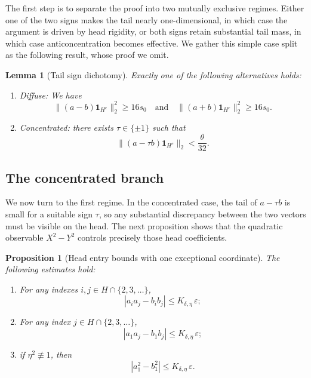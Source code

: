 \documentclass[11pt]{amsart}
\numberwithin{equation}{section}
\newtheorem{proposition}[theorem]{Proposition}
\newtheorem{lemma}[theorem]{Lemma}
\theoremstyle{definition}
\theoremstyle{remark}
\newcommand{\eps}{\varepsilon}
\newcommand{\norm}[1]{\lVert #1 \rVert}
\begin{document}
The first step is to separate the proof into two mutually exclusive regimes.
Either one of the two signs makes the tail nearly one-dimensional, in which
case the argument is driven by head rigidity, or both signs retain substantial
tail mass, in which case anticoncentration becomes effective. We gather this simple case split as the following result, whose proof we omit. 

\begin{lemma}[Tail sign dichotomy]\label{lem:dichotomy}
Exactly one of the following alternatives holds:
\begin{enumerate}[label=\rm(\roman*)]
\item \textit{Diffuse:} We have
\[
\norm{(a-b)\mathbf 1_{H^c}}_2^2\ge16s_0
\quad\text{and}\quad
\norm{(a+b)\mathbf 1_{H^c}}_2^2\ge16s_0.
\]
\item \textit{Concentrated:} there exists $\tau\in\{\pm1\}$ such that
\[
\norm{(a-\tau b)\mathbf 1_{H^c}}_2<\frac{\theta}{32}.
\]
\end{enumerate}
\end{lemma}



\subsection{The concentrated branch}

We now turn to the first regime.  In the concentrated case, the tail of
$a-\tau b$ is small for a suitable sign $\tau$, so any substantial discrepancy
between the two vectors must be visible on the head.  The next proposition
shows that the quadratic observable $X^2-Y^2$ controls precisely those
head coefficients.

\begin{proposition}[Head entry bounds with one exceptional coordinate]
\label{prop:head-entry}
The following estimates hold:
\begin{enumerate}[label=\rm(\arabic*)]
\item For any indexes $i,j\in H\cap\{2,3,\dots\}$,
\[
|a_i a_j-b_i b_j|\le K_{\delta,\eta}\,\eps;
\]
\item For any index $j\in H\cap\{2,3,\dots\}$,
\[
|a_1a_j-b_1b_j|\le K_{\delta,\eta}\,\eps;
\]
\item if $\eta^2\not\equiv1$, then
\[
|a_1^2-b_1^2|\le K_{\delta,\eta}\,\eps.
\]
\end{enumerate}
\end{proposition}
\end{document}
